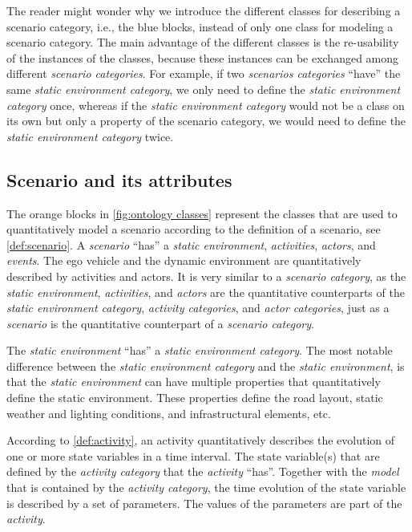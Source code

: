 
The reader might wonder why we introduce the different classes for describing a scenario category, i.e., the blue blocks, instead of only one class for modeling a scenario category. 
The main advantage of the different classes is the re-usability of the instances of the classes, because these instances can be exchanged among different \textit{scenario categories}. For example, if two \textit{scenarios categories} ``have'' the same \textit{static environment category}, we only need to define the \textit{static environment category} once, whereas if the \textit{static environment category} would not be a class on its own but only a property of the scenario category, we would need to define the \textit{static environment category} twice.



\subsection{Scenario and its attributes}
\label{sec:domain scenario}

The orange blocks in \cref{fig:ontology classes} represent the classes that are used to quantitatively model a scenario according to the definition of a scenario, see \cref{def:scenario}. A \textit{scenario} ``has'' a \textit{static environment}, \textit{activities}, \textit{actors}, and \textit{events}. 
The ego vehicle and the dynamic environment are quantitatively described by activities and actors. 
It is very similar to a \textit{scenario category}, as the \textit{static environment}, \textit{activities}, and \textit{actors} are the quantitative counterparts of the \textit{static environment category}, \textit{activity categories}, and \textit{actor categories}, just as a \textit{scenario} is the quantitative counterpart of a \textit{scenario category}. 

The \textit{static environment} ``has'' a \textit{static environment category}. The most notable difference between the \textit{static environment category} and the \textit{static environment}, is that the \textit{static environment} can have multiple properties that quantitatively define the static environment. These properties define the road layout, static weather and lighting conditions, and infrastructural elements, etc.

According to \cref{def:activity}, an activity quantitatively describes the evolution of one or more state variables in a time interval. The state variable(s) that are defined by the \textit{activity category} that the \textit{activity} ``has''. Together with the \textit{model} that is contained by the \textit{activity category}, the time evolution of the state variable is described by a set of parameters. The values of the parameters are part of the \textit{activity}. 

